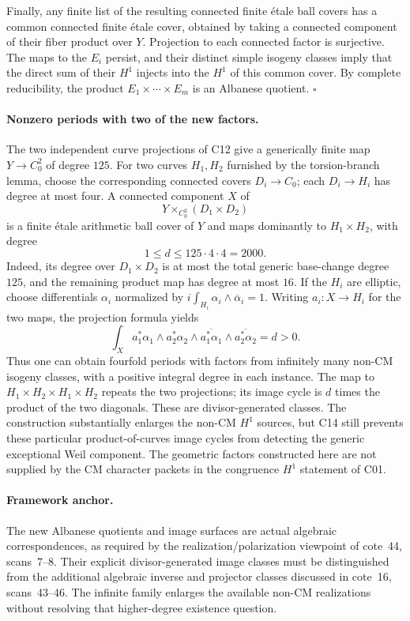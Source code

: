\documentclass[11pt]{article}
\theoremstyle{definition}\newtheorem{definition}[theorem]{Definition}\newtheorem{remark}[theorem]{Remark}
\begin{document}
Finally, any finite list of the resulting connected finite \'{e}tale
ball covers has a common connected finite \'{e}tale cover, obtained by
taking a connected component of their fiber product over $Y$.  Projection
to each connected factor is surjective.  The maps to the $E_i$ persist,
and their distinct simple isogeny classes imply that the direct sum of
their $H^1$ injects into the $H^1$ of this common cover.  By complete
reducibility, the product $E_1\times\cdots\times E_m$ is an Albanese
quotient. \hfill$\square$

\paragraph{Nonzero periods with two of the new factors.}
The two independent curve projections of C12 give a generically finite
map $Y\to C_0^2$ of degree $125$.  For two curves $H_1,H_2$ furnished by
the torsion-branch lemma, choose the corresponding connected covers
$D_i\to C_0$; each $D_i\to H_i$ has degree at most four.  A connected
component $X$ of
\[
 Y\times_{C_0^2}(D_1\times D_2)
\]
is a finite \'{e}tale arithmetic ball cover of $Y$ and maps dominantly to
$H_1\times H_2$, with degree
\[
 1\leq d\leq125\cdot4\cdot4=2000.
\]
Indeed, its degree over $D_1\times D_2$ is at most the total generic
base-change degree $125$, and the remaining product map has degree at
most $16$.  If the $H_i$ are elliptic, choose differentials $\alpha_i$
normalized by $i\int_{H_i}\alpha_i\wedge\overline\alpha_i=1$.
Writing $a_i:X\to H_i$ for the two maps, the projection formula yields
\[
 \int_X a_1^*\alpha_1\wedge a_2^*\alpha_2
       \wedge\overline{a_1^*\alpha_1}
       \wedge\overline{a_2^*\alpha_2}=d>0.
\]
Thus one can obtain fourfold periods with factors from infinitely many
non-CM isogeny classes, with a positive integral degree in each instance.
The map to $H_1\times H_2\times H_1\times H_2$ repeats the two
projections; its image cycle is $d$ times the product of the two diagonals.
These are divisor-generated classes.  The construction substantially
enlarges the non-CM $H^1$ sources, but C14 still prevents these particular
product-of-curves image cycles from detecting the generic exceptional
Weil component.  The geometric factors constructed here are not supplied
by the CM character packets in the congruence $H^1$ statement of C01.

\paragraph{Framework anchor.}
The new Albanese quotients and image surfaces are actual algebraic
correspondences, as required by the realization/polarization viewpoint
of cote~44, scans~7--8.  Their explicit divisor-generated image classes
must be distinguished from the additional algebraic inverse and projector
classes discussed in cote~16, scans~43--46.  The infinite family enlarges
the available non-CM realizations without resolving that higher-degree
existence question.
\end{document}
